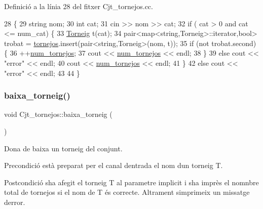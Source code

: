 Definició a la línia 28 del fitxer Cjt\+\_\+tornejos.\+cc.


\begin{DoxyCode}
28                                           \{
29     \textcolor{keywordtype}{string} nom;
30     \textcolor{keywordtype}{int} cat;
31     cin >> nom >> cat;
32     \textcolor{keywordflow}{if} ( cat > 0 and cat <= num\_cat) \{
33         \mbox{\hyperlink{class_torneig}{Torneig}} t(cat);
34         pair<map<string,Torneig>::iterator,\textcolor{keywordtype}{bool}> trobat = \mbox{\hyperlink{class_cjt__tornejos_a4b3d9bdd2ed133d76284fb510ebe9800}{tornejos}}.insert(pair<string,Torneig>(nom,
       t));
35         \textcolor{keywordflow}{if} (not trobat.second) \{
36             ++\mbox{\hyperlink{class_cjt__tornejos_afe968dc02bf4f83842c53c5a76182f2f}{num\_tornejos}};
37             cout << \mbox{\hyperlink{class_cjt__tornejos_afe968dc02bf4f83842c53c5a76182f2f}{num\_tornejos}} << endl;
38         \}
39         \textcolor{keywordflow}{else} cout << \textcolor{stringliteral}{"error"} << endl;
40             cout << \mbox{\hyperlink{class_cjt__tornejos_afe968dc02bf4f83842c53c5a76182f2f}{num\_tornejos}} << endl;
41     \}
42     \textcolor{keywordflow}{else} cout << \textcolor{stringliteral}{"error"} << endl;
43     
44 \}
\end{DoxyCode}
\mbox{\label{class_cjt__tornejos_ae549ea64527b0876bb395ba957faf387}} 
\subsubsection{\texorpdfstring{baixa\+\_\+torneig()}{baixa\_torneig()}}
{\footnotesize\ttfamily void Cjt\+\_\+tornejos\+::baixa\+\_\+torneig (\begin{DoxyParamCaption}{ }\end{DoxyParamCaption})}



Dona de baixa un torneig del conjunt. 

\begin{DoxyPrecond}{Precondició}
està preparat per el canal d\textquotesingle{}entrada el nom d\textquotesingle{}un torneig T. 
\end{DoxyPrecond}
\begin{DoxyPostcond}{Postcondició}
s\textquotesingle{}ha afegit el torneig T al parametre implicit i s\textquotesingle{}ha imprès el nomnbre total de tornejos si el nom de T és correcte. Altrament s\textquotesingle{}imprimeix un missatge d\textquotesingle{}error. 
\end{DoxyPostcond}


